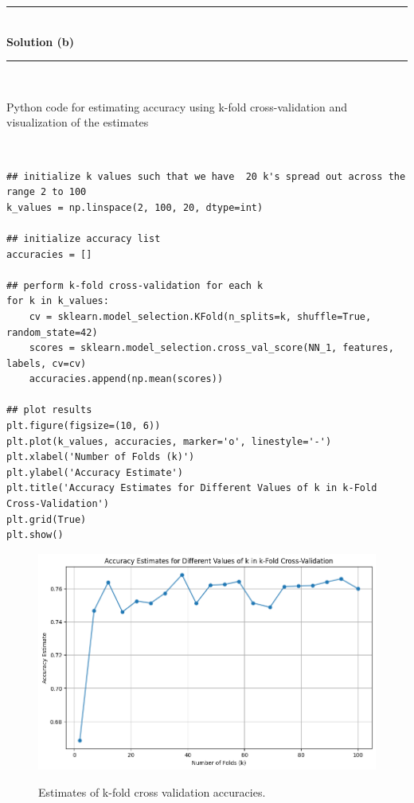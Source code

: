 \documentclass{article}
\begin{document}
\noindent\rule{\textwidth}{0.4pt}\\

\textbf{Solution (b)}

\noindent\rule{\textwidth}{0.4pt}\\

\parbox{\textwidth}{Python code for estimating accuracy using k-fold cross-validation and visualization of the estimates}\\

\begin{center}
\begin{lstlisting}
## initialize k values such that we have  20 k's spread out across the range 2 to 100
k_values = np.linspace(2, 100, 20, dtype=int)
  
## initialize accuracy list
accuracies = []
  
## perform k-fold cross-validation for each k
for k in k_values:
    cv = sklearn.model_selection.KFold(n_splits=k, shuffle=True, random_state=42)
    scores = sklearn.model_selection.cross_val_score(NN_1, features, labels, cv=cv)
    accuracies.append(np.mean(scores))
  
## plot results
plt.figure(figsize=(10, 6))
plt.plot(k_values, accuracies, marker='o', linestyle='-')
plt.xlabel('Number of Folds (k)')
plt.ylabel('Accuracy Estimate')
plt.title('Accuracy Estimates for Different Values of k in k-Fold Cross-Validation')
plt.grid(True)
plt.show()
\end{lstlisting}
\end{center}

\begin{figure}[htbp]
\includegraphics[width=1\textwidth]{q10_b.png} \\
\caption{Estimates of k-fold cross validation accuracies.}
\label{fig:image_comparison}
\end{figure} 
\end{document}
